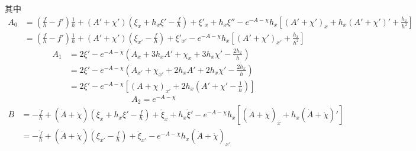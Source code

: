 \documentclass[12pt,a4paper]{ctexart}
\numberwithin{equation}{section}
\begin{document}
其中
\begin{equation}
    \begin{aligned}
        A_0&=(\frac{f}{h}-f')\frac{1}{h}+(A'+\chi')(\xi_x+h_x\xi'-\frac{f}{h})+\xi'_x+h_x\xi''-e^{-A-\chi}h_x[(A'+\chi')_x+h_x(A'+\chi')'+\frac{h_x}{h^{2}}]\\
        &=(\frac{f}{h}-f')\frac{1}{h}+(A'+\chi')(\xi_{x'}-\frac{f}{h})+\xi'_{x'}-e^{-A-\chi}h_x[(A'+\chi')_{x'}+\frac{h_x}{h^{2}}]
    \end{aligned}
\end{equation}
\begin{equation}
    \begin{aligned}
        A_1&=2\xi'-e^{-A-\chi}(A_x+3h_x A'+\chi_x+3h_x \chi'-\frac{2h_x}{h})\\
        &=2\xi'-e^{-A-\chi}(A_{x'}+\chi_{x'}+2h_x A'+2h_x \chi'-\frac{2h_x}{h})\\
        &=2\xi'-e^{-A-\chi}[(A+\chi)_{x'}+2h_x(A'+\chi'-\frac{1}{h})]
    \end{aligned}
\end{equation}
\begin{equation}
    A_2=e^{-A-\chi}
\end{equation}
\begin{equation}
    \begin{aligned}
        B&=-\frac{\dot{f}}{h}+(\dot{A}+\dot{\chi})(\xi_x+h_x\xi'-\frac{f}{h})+\dot{\xi}_x+h_x\dot{\xi}'-e^{-A-\chi}h_x[(\dot{A}+\dot{\chi})_x+h_x(\dot{A}+\dot{\chi})']\\
        &=-\frac{\dot{f}}{h}+(\dot{A}+\dot{\chi})(\xi_{x'}-\frac{f}{h})+\dot{\xi}_{x'}-e^{-A-\chi}h_x(\dot{A}+\dot{\chi})_{x'}
    \end{aligned}
\end{equation}
\end{document}
